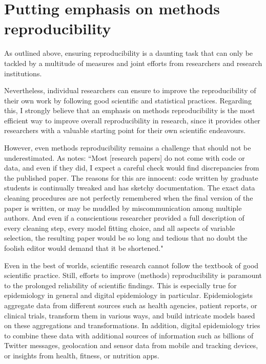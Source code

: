 \documentclass[11pt, a4paper,twoside]{report}\usepackage[]{graphicx}\usepackage[]{color}
\begin{document}
\section{Putting emphasis on methods reproducibility}
As outlined above, ensuring reproducibility is a daunting task that can only be tackled by a multitude of measures and joint efforts from researchers and research institutions. 

Nevertheless, individual researchers can ensure to improve the reproducibility of their own work by following good scientific and statistical practices. Regarding this, I strongly believe that an emphasis on methods reproducibility is the most efficient way to improve overall reproducibility in research, since it provides other researchers with a valuable starting point for their own scientific endeavours.

However, even methods reproducibility remains a challenge that should not be underestimated. As \cite{banks_reproducible_2011} notes: ``Most [research papers] do not come with code or data, and even if they did, I expect a careful check would find discrepancies from the published paper. The reasons for this are innocent: code written by graduate students is continually tweaked and has sketchy documentation. The exact data cleaning procedures are not perfectly remembered when the final version of the paper is written, or may be muddled by miscommunication among multiple authors. And even if a conscientious researcher provided a full description of every cleaning step, every model fitting choice, and all aspects of variable selection, the resulting paper would be so long and tedious that no doubt the foolish editor would demand that it be shortened."

Even in the best of worlds, scientific research cannot follow the textbook of good scientific practice. Still, efforts to improve (methods) reproducibility is paramount to the prolonged reliability of scientific findings. This is especially true for epidemiology in general and digital epidemiology in particular. Epidemiologists aggregate data from different sources such as health agencies, patient reports, or clinical trials, transform them in various ways, and build intricate models based on these aggregations and transformations. In addition, digital epidemiology tries to combine these data with additional sources of information such as billions of Twitter messages, geolocation and sensor data from mobile and tracking devices, or insights from health, fitness, or nutrition apps. 
\end{document}
